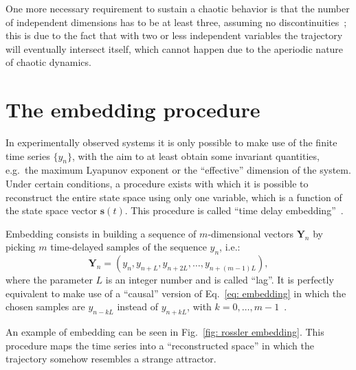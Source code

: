 One more necessary requirement to sustain a chaotic behavior is that
the number of independent dimensions has to be at least three, assuming no discontinuities~\cite{ref:chaos_two_dim_theorem};
this is due to the fact that
with two or less independent variables the trajectory will eventually intersect itself, which
cannot happen due to the aperiodic nature of chaotic dynamics.


\section{The embedding procedure}\label{sec: embedding}

In experimentally observed systems it is only possible to make use of the finite time series $\{y_n\}$,
with the aim to at least obtain some invariant quantities, e.g.\ the maximum Lyapunov exponent or
the ``effective'' dimension of the system. Under certain conditions, a procedure exists with which
it is possible to reconstruct the entire state space using only one variable, which is a
function of the state space vector $\mathbf{s}(t)$. This procedure is called ``time delay embedding''~\cite{ref:packard1980geometry}.

Embedding consists in building a sequence of $m$-dimensional vectors $\mathbf{Y}_n$ by picking
$m$ time-delayed samples of the sequence $y_n$, i.e.:
\begin{equation}
    \label{eq: embedding}
    \mathbf{Y}_n=\left(y_n,y_{n+L},y_{n+2L},\ldots,y_{n+(m-1)L}\right),
\end{equation}
where the parameter $L$ is an integer number and is called ``lag''. It is perfectly equivalent to make use of
a ``causal'' version of Eq.~\ref{eq: embedding} in which the chosen samples are $y_{n-kL}$ instead of
$y_{n+kL}$, with $k=0,\ldots,m-1$~\cite{ref:bradley2015nonlinear}.

An example of embedding can be seen in Fig.~\ref{fig: rossler embedding}.
This procedure maps the time series into a ``reconstructed space'' in which the trajectory
somehow resembles a strange attractor.

